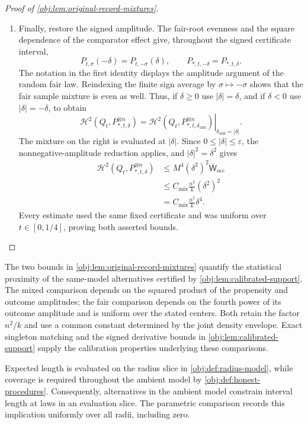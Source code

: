 \documentclass[11pt]{article}
\begin{document}
\begin{proof}[Proof of \cref{obj:lem:original-record-mixtures}]
\begin{enumerate}
\item Finally, restore the signed amplitude. The fair-root evenness and
the square dependence of the comparator effect give, throughout the
signed certificate interval,
\[
P_{t,\sigma}(-\delta)=P_{t,-\sigma}(\delta),
\qquad
P_{*,t,-\delta}=P_{*,t,\delta}.
\]
The notation in the first identity displays the amplitude argument of
the random fair law. Reindexing the finite sign average by
\(\sigma\mapsto-\sigma\) shows that the fair sample mixture is even
as well. Thus, if \(\delta\ge0\) use \(|\delta|=\delta\), and if
\(\delta<0\) use \(|\delta|=-\delta\), to obtain
\[
\mathcal H^2(Q_t,P_{*,t,\delta}^{\otimes n})
=
\left.
\mathcal H^2(Q_t,P_{*,t,\delta_{\mathrm{aux}}}^{\otimes n})
\right|_{\delta_{\mathrm{aux}}=|\delta|}.
\]
The mixture on the right is evaluated at \(|\delta|\).
Since \(0\le|\delta|\le\varepsilon\), the nonnegative-amplitude
reduction applies, and \(|\delta|^2=\delta^2\) gives
\[
\begin{aligned}
\mathcal H^2(Q_t,P_{*,t,\delta}^{\otimes n})
&\le M^4(\delta^2)^2\overline{\mathsf W}_{\mathrm{occ}}\\
&\le C_{\mathrm{mix}}\frac{n^2}{k}(\delta^2)^2\\
&=C_{\mathrm{mix}}\frac{n^2}{k}\delta^4.
\end{aligned}
\]
Every estimate used the same fixed certificate and was uniform over
\(t\in[0,1/4]\), proving both asserted bounds.
\end{enumerate}
\end{proof}

The two bounds in \cref{obj:lem:original-record-mixtures} quantify the statistical proximity of the same-model alternatives certified by \cref{obj:lem:calibrated-support}. The mixed comparison depends on the squared product of the propensity and outcome amplitudes; the fair comparison depends on the fourth power of its outcome amplitude and is uniform over the stated centers. Both retain the factor \(n^2/k\) and use a common constant determined by the joint density envelope. Exact singleton matching and the signed derivative bounds in \cref{obj:lem:calibrated-support} supply the calibration properties underlying these comparisons.

Expected length is evaluated on the radius slice in \cref{obj:def:radius-model}, while coverage is required throughout the ambient model by \cref{obj:def:honest-procedures}. Consequently, alternatives in the ambient model constrain interval length at laws in an evaluation slice. The parametric comparison records this implication uniformly over all radii, including zero.
\end{document}
